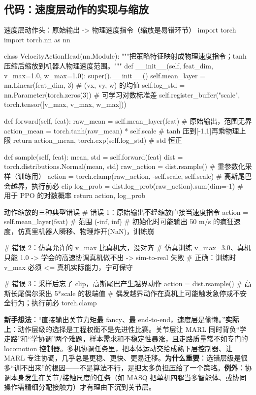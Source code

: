 \subsection{代码：速度层动作的实现与缩放}
\label{sec:mc-action-code}

\begin{codebox}[Python]{速度层动作头：原始输出 -> 物理速度指令（缩放是易错环节）}
import torch
import torch.nn as nn

class VelocityActionHead(nn.Module):
    """把策略特征映射成物理速度指令；tanh 压缩后缩放到机器人物理速度范围。"""
    def __init__(self, feat_dim, v_max=1.0, w_max=1.0):
        super().__init__()
        self.mean_layer = nn.Linear(feat_dim, 3)             # (vx, vy, w) 的均值
        self.log_std = nn.Parameter(torch.zeros(3))          # 可学习对数标准差
        self.register_buffer("scale", torch.tensor([v_max, v_max, w_max]))

    def forward(self, feat):
        raw_mean = self.mean_layer(feat)                     # 原始输出，范围无界
        action_mean = torch.tanh(raw_mean) * self.scale      # tanh 压到[-1,1]再乘物理上限
        return action_mean, torch.exp(self.log_std)          # std 恒正

    def sample(self, feat):
        mean, std = self.forward(feat)
        dist = torch.distributions.Normal(mean, std)
        raw_action = dist.rsample()                           # 重参数化采样（训练用）
        action = torch.clamp(raw_action, -self.scale, self.scale)  # 高斯尾巴会越界，执行前必 clip
        log_prob = dist.log_prob(raw_action).sum(dim=-1)     # 用于 PPO 的对数概率
        return action, log_prob
\end{codebox}

\begin{codebox}[Python]{动作缩放的三种典型错误}
# 错误 1：原始输出不经缩放直接当速度指令
action = self.mean_layer(feat)        # 范围 (-inf, inf)
#   初始化时可能输出 50 m/s 的疯狂速度，仿真里机器人瞬移、物理炸开(NaN)，训练崩

# 错误 2：仿真允许的 v_max 比真机大，没对齐
#   仿真训练 v_max=3.0、真机只能 1.0 -> 学会的高速协调真机做不出 -> sim-to-real 失败
#   正确：训练时 v_max 必须 <= 真机实际能力，宁可保守

# 错误 3：采样后忘了 clip，高斯尾巴产生越界动作
action = dist.rsample()               # 高斯长尾偶尔采出 5*scale 的极端值
#   偶发越界动作在真机上可能触发急停或不安全行为；执行前必 torch.clamp
\end{codebox}

\begin{pitfall}
\textbf{新手想法}：“直接输出关节力矩最 fancy、最 end-to-end，速度层是偷懒。”\textbf{实际上}：动作层级的选择是工程权衡不是先进性比赛。关节层让 MARL 同时背负“学走路”和“学协调”两个难题，样本需求和不稳定性暴涨，且走路质量常不如专门的 locomotion 控制器。多机协调任务里，把本体运动交给成熟下层控制器、让 MARL 专注协调，几乎总是更稳、更快、更易迁移。\textbf{为什么重要}：选错层级是很多“训不出来”的根因——不是算法不行，是把太多负担压给了一个策略。\textbf{例外}：协调本身发生在关节/接触尺度的任务（如 MASQ 把单机四腿当多智能体、或协同操作需精细分配接触力）才有理由下沉到关节层。
\end{pitfall}

